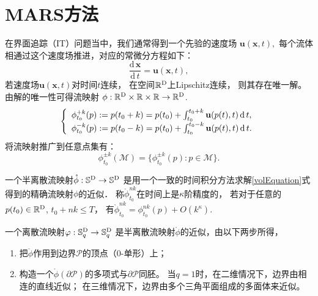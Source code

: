 
\section{MARS方法\cite{zhang2016mars}}

在界面追踪（IT）问题当中，我们通常得到一个先验的速度场
$\mathbf{u}(\mathbf{x},t),$
每个流体相通过这个速度场推进，对应的常微分方程如下：
\begin{equation}
\label{volEquation}
\frac{\mathrm{d}\, \mathbf{x}}{\mathrm{d}\, t}=\mathbf{u}(\mathbf{x},t),
\end{equation}
若速度场$\mathbf{u}(\mathbf{x},t)$对时间$t$连续，
在空间$\mathbb{R}^{\textup{D}}$上Lipschitz连续，
则其存在唯一解。由解的唯一性可得流映射 $\phi: \mathbb{R}^{\textup{D}}\times \mathbb{R}\times\mathbb{R}\rightarrow \mathbb{R}^{\text{D}}$.
\begin{equation} 
\label{eq:tracing}
\renewcommand{\arraystretch}{1.3}
\left\{
\begin{array}{l}
\phi_{t_0}^{+k}(p) := p(t_0+k) 
= p(t_0) + \int_{t_0}^{t_0+k} \mathbf{u}(p(t),t)\,\mathrm{d}\, t,
\\
\phi_{t_0}^{-k}(p) := p(t_0-k) 
= p(t_0) + \int_{t_0}^{t_0-k} \mathbf{u}(p(t),t)\,\mathrm{d}\,t.
\end{array}
\right.
\end{equation}
将流映射推广到任意点集有：
\begin{displaymath}
\phi_{t_0}^{\pm k}({\mathcal M})  
= \{\phi_{t_0}^{\pm k}(p) : p\in {\mathcal M}\}.
\end{displaymath}

\begin{defn}
	一个半离散流映射$\mathring{ \phi} : \mathbb{S}^{\textup{D}}\rightarrow \mathbb{S}^{\textup{D}}$
	是用一个一致的时间积分方法求解\eqref{volEquation}式得到的精确流映射$\phi$的近似．
	称$\mathring{ \phi}_{t_0}^{nk}$在时间上是$\kappa$阶精度的，
	若对于任意的$p(t_0)\in \mathbb{R}^{\textup{D}}$, $t_0+nk\leq T$，
	有$\mathring{ \phi}_{t_0}^{nk}=\phi_{t_0}^{nk}(p)+O(k^{\kappa})$.
\end{defn}
\begin{defn}
	一个离散流映射$\varphi : \mathbb{S}_q^{\textup{D}}\rightarrow\mathbb{S}_q^{\textup{D}}$
	是半离散流映射$\mathring{ \phi}$的近似，由以下两步所得，
	\begin{enumerate}
		\item 把$\mathring{ \phi}$作用到边界$\mathcal{P}$的顶点（$0$-单形）上；
		\item 构造一个$\mathring{ \phi}(\partial\mathcal{P})$的多项式与$\partial \mathcal{P}$同胚。
		当$q=1$时，在二维情况下，边界由相连的直线近似；
		在三维情况下，边界由多个三角平面组成的多面体来近似。
	\end{enumerate}
\end{defn}

